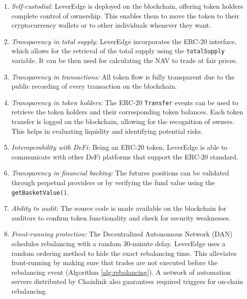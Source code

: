 \begin{enumerate}[label={\ref{sec:proposal}.\arabic*},leftmargin=*]
	\item \textit{Self-custodial:} LeverEdge is deployed on the blockchain, offering token holders complete control of ownership. This enables them to move the token to their cryptocurrency wallets or to other individuals whenever they want.
	
	\item \textit{Transparency in total supply:} LeverEdge incorporates the ERC-20 interface, which allows for the retrieval of the total supply using the \texttt{totalSupply} variable. It can be then used for calculating the NAV to trade at fair prices.
	
	\item \textit{Transparency in transactions:} All token flow is fully transparent due to the public recording of every transaction on the blockchain.
	
	\item \textit{Transparency in token holders:} The ERC-20 \texttt{Transfer} events can be used to retrieve the token holders and their corresponding token balances. Each token transfer is logged on the blockchain, allowing for the recognition of owners. This helps in evaluating liquidity and identifying potential risks.
	
	\item \textit{Interoperability with DeFi:} Being an ERC-20 token, LeverEdge is able to communicate with other DeFi platforms that support the ERC-20 standard.	
	
	\item \textit{Transparency in financial backing:} The futures positions can be validated through perpetual providers or by verifying the fund value using the \texttt{getBasketValue()}.
	
	\item \textit{Ability to audit:} The source code is made available on the blockchain for auditors to confirm token functionality and check for security weaknesses.
	
	\item \textit{Front-running protection:} The Decentralized Autonomous Network (DAN) schedules rebalancing with a random 30-minute delay. LeverEdge uses a random ordering method to hide the exact rebalancing time. This alleviates front-running by making sure that trades are not executed before the rebalancing event (Algorithm \ref{alg:rebalancing}). A network of automation servers distributed by Chainlink also guarantees required triggers for on-chain rebalancing.
	

\end{enumerate}
